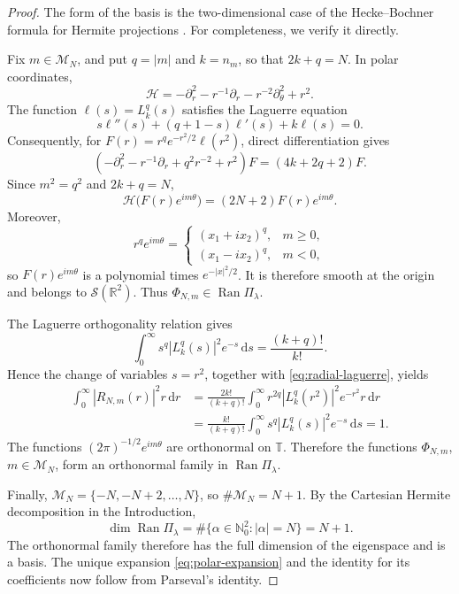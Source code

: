\documentclass[11pt,a4paper]{amsart}
\numberwithin{equation}{section}
\newcommand{\R}{\mathbb R}
\newcommand{\T}{\mathbb T}
\newcommand{\dd}{\,\mathrm d}
\begin{document}
\begin{proof}
The form of the basis is the two-dimensional case of the Hecke--Bochner
formula for Hermite projections \cite[Theorem~3.4.1]{Thangavelu}. For
completeness, we verify it directly.

Fix \(m\in\mathcal M_N\), and put \(q=|m|\) and \(k=n_m\), so that
\(2k+q=N\). In polar coordinates,
\[
 \mathcal H=-\partial_r^2-r^{-1}\partial_r-r^{-2}\partial_\theta^2+r^2.
\]
The function \(\ell(s)=L_k^q(s)\) satisfies the Laguerre equation
\[
 s\ell''(s)+(q+1-s)\ell'(s)+k\ell(s)=0.
\]
Consequently, for \(F(r)=r^qe^{-r^2/2}\ell(r^2)\), direct differentiation
gives
\[
 \left(-\partial_r^2-r^{-1}\partial_r+q^2r^{-2}+r^2\right)F
 =(4k+2q+2)F.
\]
Since \(m^2=q^2\) and \(2k+q=N\),
\[
 \mathcal H\bigl(F(r)e^{im\theta}\bigr)
 =(2N+2)F(r)e^{im\theta}.
\]
Moreover,
\[
 r^qe^{im\theta}=
 \begin{cases}
  (x_1+ix_2)^q,&m\ge0,\\
  (x_1-ix_2)^q,&m<0,
 \end{cases}
\]
so \(F(r)e^{im\theta}\) is a polynomial times \(e^{-|x|^2/2}\). It is
therefore smooth at the origin and belongs to \(\mathcal S(\R^2)\). Thus
\(\Phi_{N,m}\in\operatorname{Ran}\Pi_\lambda\).

The Laguerre orthogonality relation
\cite[(5.1.1)]{Szego} gives
\[
 \int_0^\infty s^q|L_k^q(s)|^2e^{-s}\dd s=\frac{(k+q)!}{k!}.
\]
Hence the change of variables \(s=r^2\), together with
\eqref{eq:radial-laguerre}, yields
\begin{align*}
 \int_0^\infty|R_{N,m}(r)|^2r\dd r
 &=\frac{2k!}{(k+q)!}
   \int_0^\infty r^{2q}|L_k^q(r^2)|^2e^{-r^2}r\dd r\\
 &=\frac{k!}{(k+q)!}
   \int_0^\infty s^q|L_k^q(s)|^2e^{-s}\dd s
 =1.
\end{align*}
The functions \((2\pi)^{-1/2}e^{im\theta}\) are orthonormal on \(\T\).
Therefore the functions \(\Phi_{N,m}\), \(m\in\mathcal M_N\), form an
orthonormal family in \(\operatorname{Ran}\Pi_\lambda\).

Finally, \(\mathcal M_N=\{-N,-N+2,\ldots,N\}\), so
\(\#\mathcal M_N=N+1\). By the Cartesian Hermite decomposition in the
Introduction,
\[
 \dim\operatorname{Ran}\Pi_\lambda
 =\#\{\alpha\in\mathbb N_0^2:|\alpha|=N\}=N+1.
\]
The orthonormal family therefore has the full dimension of the eigenspace and
is a basis. The unique expansion \eqref{eq:polar-expansion} and the identity
for its coefficients now follow from Parseval's identity.
\end{proof}
\end{document}
